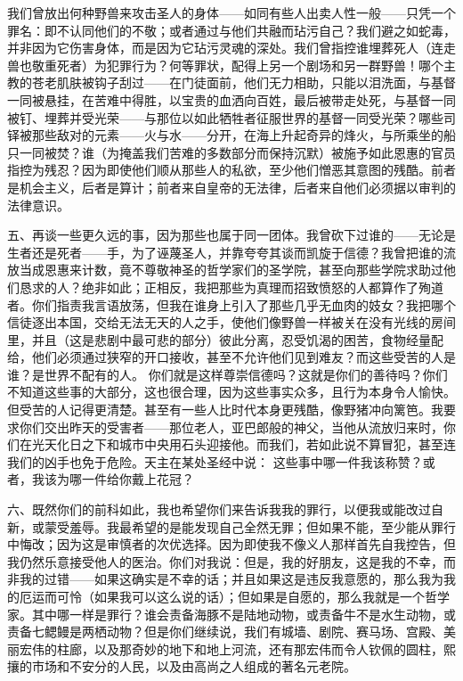 我们曾放出何种野兽来攻击圣人的身体——如同有些人出卖人性一般——只凭一个罪名：即不认同他们的不敬；或者通过与他们共融而玷污自己？我们避之如蛇毒，并非因为它伤害身体，而是因为它玷污灵魂的深处。我们曾指控谁埋葬死人（连走兽也敬重死者）为犯罪行为？何等罪状，配得上另一个剧场和另一群野兽！哪个主教的苍老肌肤被钩子刮过——在门徒面前，他们无力相助，只能以泪洗面，与基督一同被悬挂，在苦难中得胜，以宝贵的血洒向百姓，最后被带走处死，与基督一同被钉、埋葬并受光荣——与那位以如此牺牲者征服世界的基督一同受光荣？哪些司铎被那些敌对的元素——火与水——分开，在海上升起奇异的烽火，与所乘坐的船只一同被焚？谁（为掩盖我们苦难的多数部分而保持沉默）被施予如此恩惠的官员指控为残忍？因为即使他们顺从那些人的私欲，至少他们憎恶其意图的残酷。前者是机会主义，后者是算计；前者来自皇帝的无法律，后者来自他们必须据以审判的法律意识。\par

五、再谈一些更久远的事，因为那些也属于同一团体。我曾砍下过谁的——无论是生者还是死者——手，为了诬蔑圣人，并靠夸夸其谈而凯旋于信德？我曾把谁的流放当成恩惠来计数，竟不尊敬神圣的哲学家们的圣学院，甚至向那些学院求助过他们恳求的人？绝非如此；正相反，我把那些为真理而招致愤怒的人都算作了殉道者。你们指责我言语放荡，但我在谁身上引入了那些几乎无血肉的妓女？我把哪个信徒逐出本国，交给无法无天的人之手，使他们像野兽一样被关在没有光线的房间里，并且（这是悲剧中最可悲的部分）彼此分离，忍受饥渴的困苦，食物经量配给，他们必须通过狭窄的开口接收，甚至不允许他们见到难友？而这些受苦的人是谁？是世界不配有的人。 你们就是这样尊崇信德吗？这就是你们的善待吗？你们不知道这些事的大部分，这也很合理，因为这些事实众多，且行为本身令人愉快。但受苦的人记得更清楚。甚至有一些人比时代本身更残酷，像野猪冲向篱笆。我要求你们交出昨天的受害者——那位老人，亚巴郎般的神父，当他从流放归来时，你们在光天化日之下和城市中央用石头迎接他。而我们，若如此说不算冒犯，甚至连我们的凶手也免于危险。天主在某处圣经中说： 这些事中哪一件我该称赞？或者，我该为哪一件给你戴上花冠？\par

六、既然你们的前科如此，我也希望你们来告诉我我的罪行，以便我或能改过自新，或蒙受羞辱。我最希望的是能发现自己全然无罪；但如果不能，至少能从罪行中悔改；因为这是审慎者的次优选择。因为即使我不像义人那样首先自我控告，但我仍然乐意接受他人的医治。你们对我说：但是，我的好朋友，这是我的不幸，而非我的过错——如果这确实是不幸的话；并且如果这是违反我意愿的，那么我为我的厄运而可怜（如果我可以这么说的话）；但如果是自愿的，那么我就是一个哲学家。其中哪一样是罪行？谁会责备海豚不是陆地动物，或责备牛不是水生动物，或责备七鳃鳗是两栖动物？但是你们继续说，我们有城墙、剧院、赛马场、宫殿、美丽宏伟的柱廊，以及那奇妙的地下和地上河流，还有那宏伟而令人钦佩的圆柱，熙攘的市场和不安分的人民，以及由高尚之人组成的著名元老院。\par

